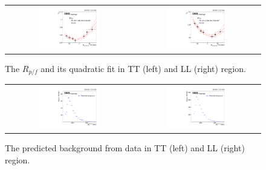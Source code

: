 \begin{figure}[t]
  \centering
 \begin{tabular}{cc}
    \includegraphics[width=0.5\textwidth]{Figures/al/1d_TT.pdf} &
   \includegraphics[width=0.5\textwidth]{Figures/al/1d_LL.pdf} 
   
  \end{tabular}
  \caption{The $R_{p/f}$ and its quadratic fit in TT (left) and LL (right) region.}
  \label{fig:hvt_brs}
\end{figure}

\begin{figure}[t]
  \centering
 \begin{tabular}{cc}
    \includegraphics[width=0.5\textwidth]{Figures/al/mjj_TT.pdf} &
   \includegraphics[width=0.5\textwidth]{Figures/al/mjj_LL.pdf} 
   
  \end{tabular}
  \caption{The predicted background from data in TT (left) and LL (right) region.}
  \label{fig:hvt_brs}
\end{figure}

